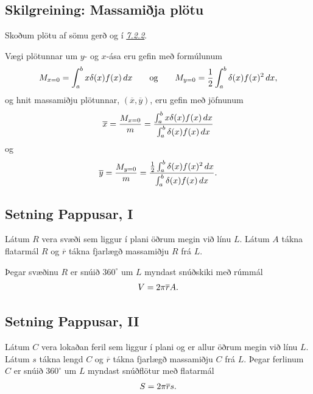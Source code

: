 \documentclass[a4paper,10pt,icelandic]{sphinxmanual}
\begin{document}
\subsection{Skilgreining: Massamiðja plötu}
\label{kafli07:skilgreining-massamija-plotu}\label{kafli07:index-14}
Skoðum plötu af sömu gerð og í {\hyperref[kafli07:massi\string-plotu]{\emph{7.2.2}}}.

Vægi plötunnar um \(y\)- og \(x\)-ása eru gefin með formúlunum
\begin{gather}
\begin{split}M_{x=0}=\int_a^b x\delta(x)f(x)\,dx
\qquad\mbox{og}\qquad
M_{y=0}=\frac{1}{2}\int_a^b \delta(x)f(x)^2\,dx,\end{split}\notag
\end{gather}
og hnit massamiðju plötunnar, \((\overline{x}, \overline{y})\), eru
gefin með jöfnunum
\begin{gather}
\begin{split}\overline{x}=\frac{M_{x=0}}{m}=
\frac{\int_a^b x\delta(x)f(x)\,dx}{\int_a^b \delta(x)f(x)\,dx}\end{split}\notag
\end{gather}
og
\begin{gather}
\begin{split}\overline{y}=\frac{M_{y=0}}{m}=
\frac{\frac{1}{2}\int_a^b \delta(x)f(x)^2\,dx}{\int_a^b
\delta(x)f(x)\,dx}.\end{split}\notag
\end{gather}

\subsection{Setning Pappusar, I}
\label{kafli07:index-15}\label{kafli07:setning-pappusar-i}
Látum \(R\) vera svæði sem liggur í plani öðrum megin við línu
\(L\). Látum \(A\) tákna flatarmál \(R\) og
\(\overline{r}\) tákna fjarlægð massamiðju \(R\) frá \(L\).

Þegar svæðinu \(R\) er snúið \(360^\circ\) um \(L\) myndast
snúðskiki með rúmmál
\begin{gather}
\begin{split}V=2\pi\overline{r}A.\end{split}\notag
\end{gather}

\subsection{Setning Pappusar, II}
\label{kafli07:setning-pappusar-ii}
Látum \(C\) vera lokaðan feril sem liggur í plani og er allur öðrum
megin við línu \(L\). Látum \(s\) tákna lengd \(C\) og
\(\overline{r}\) tákna fjarlægð massamiðju \(C\) frá \(L\).
Þegar ferlinum \(C\) er snúið \(360^\circ\) um \(L\) myndast
snúðflötur með flatarmál
\begin{gather}
\begin{split}S=2\pi\overline{r}s.\end{split}\notag
\end{gather}
\end{document}
